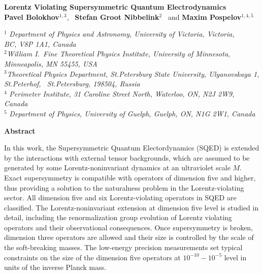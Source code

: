 \documentclass[12pt]{revtex4}
\begin{document}
\begin{titlepage}
\renewcommand{\thefootnote}{\fnsymbol{footnote}}

\begin{center}
\vspace{0.5cm}

\large {\bf Lorentz Violating Supersymmetric Quantum Electrodynamics}\\[3mm]
  
\vspace*{0.5cm}
\normalsize
{\bf Pavel Bolokhov}$^{1,3}$, ~{\bf Stefan Groot Nibbelink}$^{2}$
\ and
{\bf Maxim Pospelov}$^{1,4,5}$%

\vspace*{0.5cm}
$^{1}$ {\it Department of Physics and Astronomy,
University of Victoria, Victoria,\\ BC, V8P 1A1, Canada}\\
$^{2}${\it William I.\ Fine Theoretical Physics Institute,
University of Minnesota,\\ Minneapolis, MN 55455, USA}\\
$^{3}${\it Theoretical Physics Department, St.Petersburg State University, Ulyanovskaya 1,\\
St.Peterhof, ~St.Petersburg, 198504, Russia}\\
$^{4}$ {\it Perimeter Institute, 31 Caroline Street North,
Waterloo, ON,  N2J 2W9,
Canada}\\
$^{5}$ {\it Department of Physics,
 University of Guelph,
 Guelph, ON,  N1G 2W1, Canada}
 \end{center}

\centerline{\large\bf Abstract}
In this work, the Supersymmetric Quantum Electordynamics (SQED) is extended by 
the interactions with external tensor backgrounds, which are 
assumed to be generated by some Lorentz-noninvariant 
dynamics at an ultraviolet scale $M$. Exact supersymmetry is compatible with operators 
of dimension five and higher, thus providing a solution 
to the naturalness problem in the 
Lorentz-violating sector. All dimension five and six 
Lorentz-violating operators in SQED are classified.
The Lorentz-noninvariant extension at dimension five level 
is studied in detail, including the 
renormalization group evolution of Lorentz violating operators 
and their observational consequences. 
Once supersymmetry is broken, dimension three operators are 
allowed and their size is controlled by the scale of the 
soft-breaking masses. The low-energy precision measurements 
set typical constraints on the size of the dimension 
five operators at $10^{-10}-10^{-5}$ level in units of the inverse Planck mass. 




\end{titlepage}
\end{document}
